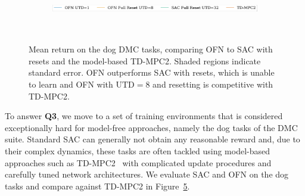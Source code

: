 \begin{figure}[t]
\centering
    \begin{subfigure}[b]{0.8\textwidth}
        \centering
        \includegraphics[height=0.4cm]{figures/dissecting/dog_exp/dog_legend.pdf}
    \end{subfigure}\\%
    \begin{subfigure}[t]{0.25\textwidth}
        \centering
        \label{subfig:dog_stand}
    \end{subfigure}%
    \begin{subfigure}[t]{0.25\textwidth}
        \centering
        \label{subfig:dog_walk}
    \end{subfigure}%
    \begin{subfigure}[t]{0.25\textwidth}
    \centering
        \label{subfig:dog_trot}
    \end{subfigure}%
    \begin{subfigure}[t]{0.25\textwidth}
        \centering
        \label{subfig:dog_run}
    \end{subfigure}%
    \caption{Mean return on the dog DMC tasks, comparing OFN to SAC with resets and the model-based TD-MPC2. Shaded regions indicate standard error. OFN outperforms SAC with resets, which is unable to learn and OFN with $\mathrm{UTD}=8$ and resetting is competitive with TD-MPC2.}
    \label{fig:all_dog}
\end{figure}

To answer \textbf{Q3}, we move to a set of training environments that is considered exceptionally hard for model-free approaches, namely the dog tasks of the DMC suite. Standard SAC can generally not obtain any reasonable reward and, due to their complex dynamics, these tasks are often tackled using model-based approaches such as TD-MPC2~\parencite{hansen2024tdmpc} with complicated update procedures and carefully tuned network architectures. We evaluate SAC and OFN on the dog tasks and compare against TD-MPC2 in Figure~\ref{fig:all_dog}.


